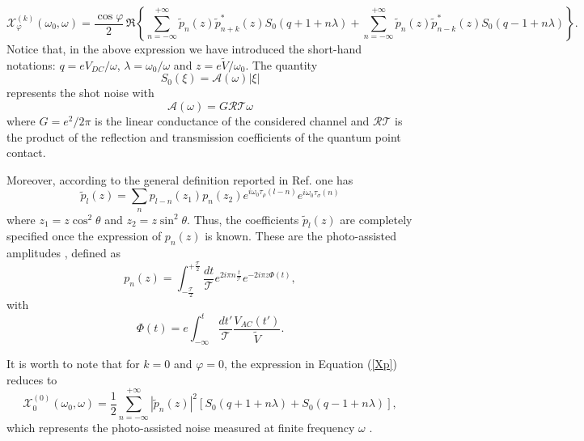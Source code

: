 \documentclass[12pt]{iopart}
\begin{document}
\begin{equation}
\mathcal{X}^{(k)}_{\varphi}(\omega_0,\omega)=\frac{\cos{\varphi}}{2}\, \Re\left\{\sum_{n=-\infty}^{+\infty} \widetilde{p}_{n}(z) \widetilde{p}^{*}_{n+k}(z) S_{0}(q+1+n\lambda)+  \sum_{n=-\infty}^{+\infty} \widetilde{p}_{n}(z) \widetilde{p}^{*}_{n-k}(z) S_{0}(q-1+n\lambda)  \right\}.
\label{Xp_extended}
\end{equation}
Notice that, in the above expression we have introduced the short-hand notations: $q=e V_{DC}/\omega$, $\lambda=\omega_{0}/\omega$ and $z=e \tilde{V}/\omega_{0}$. The quantity \begin{equation}
S_{0}(\xi)= \mathcal{A}(\omega) |\xi|
\end{equation}
represents the shot noise \cite{Blanter00, Martin05} with 
\begin{equation}
\mathcal{A}(\omega)=G \mathcal{R}\mathcal{T} \omega
\end{equation}
where $G=e^{2}/2 \pi$ is the linear conductance of the considered channel and $\mathcal{R}\mathcal{T}$ is the product of the reflection and transmission coefficients of the quantum point contact. 
 
Moreover, according to the general definition reported in Ref. \cite{Rebora20} one has
\begin{equation}
  \widetilde{p}_{l}(z)=\sum_{n} p_{l-n}(z_1)p_{n}(z_2) e^{i \omega_{0}\tau_\rho (l-n)} e^{i \omega_{0}\tau_\sigma (n)}
\end{equation}
where $z_1=z\cos^2\theta $ and $z_2=z\sin^2\theta $. Thus, the coefficients $\widetilde{p}_{l}(z)$ are completely specified once the expression of $p_{n}(z)$ is known. These are the photo-assisted amplitudes \cite{Dubois13, Crepieux04}, defined as
\begin{equation}
p_{n}(z) = \int_{-\frac{\mathcal{T}}{2}}^{+\frac{\mathcal{T}}{2}} \frac{dt}{\mathcal{T}} e^{2 i \pi  n \frac{t}{\mathcal{T}}} e^{- 2 i\pi  z  \Phi(t)}, 
\label{eq:defpofl}
\end{equation}
with 
\begin{equation}
\Phi (t) = e \int_{-\infty}^t \frac{dt'}{\mathcal{T}}\frac{V_{AC}(t')}{\tilde{V}}.
\end{equation}


It is worth to note that for $k=0$ and $\varphi=0$, the expression in Equation (\ref{Xp}) reduces to
\begin{equation}
\mathcal{X}^{(0)}_{0}(\omega_0,\omega)=\frac{1}{2} \sum_{n=-\infty}^{+\infty}|\widetilde{p}_{n}(z)|^2 \left[S_{0}(q+1+n\lambda)+ S_{0}(q-1+n\lambda)\right],
\label{S_tilde}
\end{equation}
which represents the photo-assisted noise measured at finite frequency $\omega$ \cite{Gasse13}.
\end{document}
